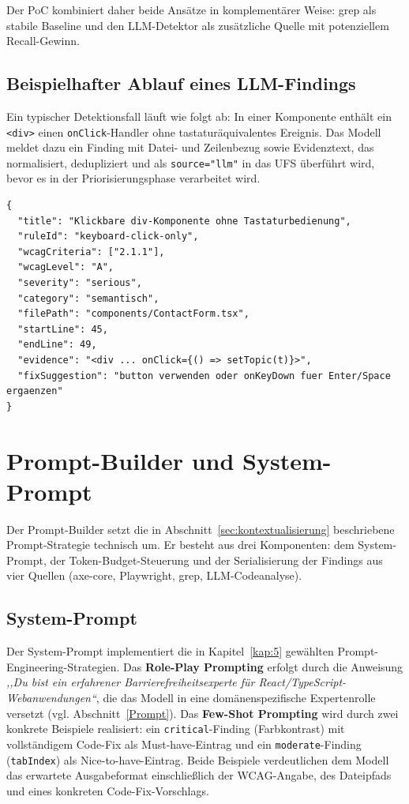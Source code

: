 Der \ac{PoC} kombiniert daher beide Ansätze in komplementärer Weise: grep als stabile Baseline und den \acs{LLM}-Detektor als zusätzliche Quelle mit potenziellem Recall-Gewinn.

\subsection{Beispielhafter Ablauf eines \acs{LLM}-Findings}

Ein typischer Detektionsfall läuft wie folgt ab: In einer Komponente enthält ein \texttt{<div>} einen \texttt{onClick}-Handler ohne tastaturäquivalentes Ereignis. Das Modell meldet dazu ein Finding mit Datei- und Zeilenbezug sowie Evidenztext, das normalisiert, dedupliziert und als \texttt{source="llm"} in das \ac{UFS} überführt wird, bevor es in der Priorisierungsphase verarbeitet wird.

\begin{lstlisting}[language={}, caption={Beispiel eines validierten \acs{LLM}-Detektor-Findings (vereinfacht)}]
{
  "title": "Klickbare div-Komponente ohne Tastaturbedienung",
  "ruleId": "keyboard-click-only",
  "wcagCriteria": ["2.1.1"],
  "wcagLevel": "A",
  "severity": "serious",
  "category": "semantisch",
  "filePath": "components/ContactForm.tsx",
  "startLine": 45,
  "endLine": 49,
  "evidence": "<div ... onClick={() => setTopic(t)}>",
  "fixSuggestion": "button verwenden oder onKeyDown fuer Enter/Space ergaenzen"
}
\end{lstlisting}

\section{Prompt-Builder und System-Prompt}
\label{sec:impl-prompt}

Der Prompt-Builder setzt die in Abschnitt~\ref{sec:kontextualisierung} beschriebene Prompt-Strategie technisch um. Er besteht aus drei Komponenten: dem System-Prompt, der Token-Budget-Steuerung und der Serialisierung der Findings aus vier Quellen (axe-core, Playwright, grep, \ac{LLM}-Codeanalyse).

\subsection{System-Prompt}

Der System-Prompt implementiert die in Kapitel~\ref{kap:5} gewählten Prompt-Engineering-Strategien. Das \textbf{Role-Play Prompting} erfolgt durch die Anweisung \emph{,,Du bist ein erfahrener Barrierefreiheitsexperte für React/TypeScript-Webanwendungen``}, die das Modell in eine domänenspezifische Expertenrolle versetzt (vgl. Abschnitt~\ref{Prompt}). Das \textbf{Few-Shot Prompting} wird durch zwei konkrete Beispiele realisiert: ein \texttt{critical}-Finding (Farbkontrast) mit vollständigem Code-Fix als Must-have-Eintrag und ein \texttt{moderate}-Finding (\texttt{tabIndex}) als Nice-to-have-Eintrag. Beide Beispiele verdeutlichen dem Modell das erwartete Ausgabeformat einschließlich der \ac{WCAG}-Angabe, des Dateipfads und eines konkreten Code-Fix-Vorschlags.

